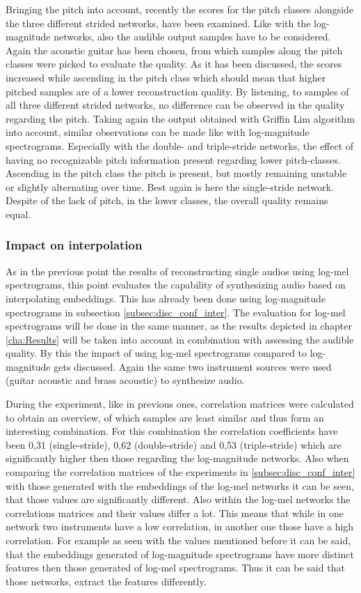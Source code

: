 Bringing the pitch into account, recently the scores for the pitch classes alongside the three different strided networks, have been examined. Like with the log-magnitude networks, also the audible output samples have to be considered. Again the acoustic guitar has been chosen, from which samples along the pitch classes were picked to evaluate the quality. As it has been discussed, the scores increased while ascending in the pitch class which should mean that higher pitched samples are of a lower reconstruction quality. By listening, to samples of all three different strided networks, no difference can be observed in the quality regarding the pitch. Taking again the output obtained with Griffin Lim algorithm into account, similar observations can be made like with log-magnitude spectrograms. Especially with the double- and triple-stride networks, the effect of having no recognizable pitch information present regarding lower pitch-classes. Ascending in the pitch class the pitch is present, but mostly remaining unstable or slightly alternating over time. Best again is here the single-stride network. Despite of the lack of pitch, in the lower classes, the overall quality remains equal.

\subsubsection{Impact on interpolation}
As in the previous point the results of reconstructing single audios using log-mel spectrograms, this point evaluates the capability of synthesizing audio based on interpolating embeddings. This has already been done using log-magnitude spectrograms in subsection \ref{subsec:disc_conf_inter}. The evaluation for log-mel spectrograms will be done in the same manner, as the results depicted in chapter \ref{cha:Results} will be taken into account in combination with assessing the audible quality. By this the impact of using log-mel spectrograms compared to log-magnitude gets discussed. Again the same two instrument sources were used (guitar acoustic and brass acoustic) to synthesize audio.

During the experiment, like in previous ones, correlation matrices were calculated to obtain an overview, of which samples are least similar and thus form an interesting combination. For this combination the correlation coefficients have been 0,31 (single-stride), 0,62 (double-stride) and 0,53 (triple-stride) which are significantly higher then those regarding the log-magnitude networks. Also when comparing the correlation matrices of the experiments in \ref{subsec:disc_conf_inter} with those generated with the embeddings of the log-mel networks it can be seen, that those values are significantly different. Also within the log-mel networks the correlations matrices and their values differ a lot. This means that while in one network two instruments have a low correlation, in another one those have a high correlation. 
For example as seen with the values mentioned before it can be said, that the embeddings generated of log-magnitude spectrograms have more distinct features then those generated of log-mel spectrograms. Thus it can be said that those networks, extract the features differently.

